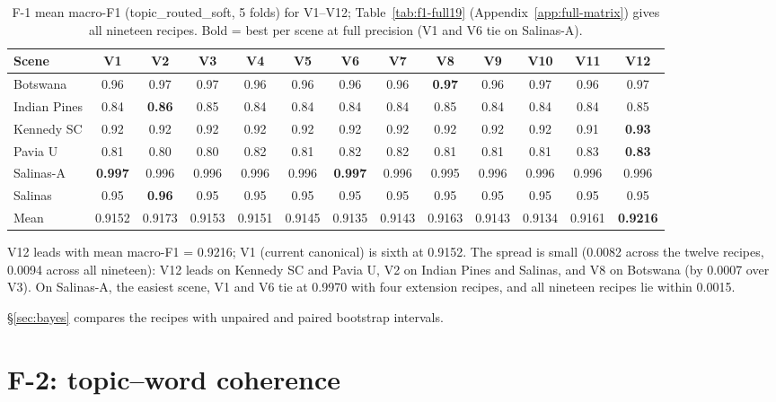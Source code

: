 \documentclass[journal,a4paper,10pt]{IEEEtran}
\begin{document}
\begin{table}[ht]
\caption{F-1 mean macro-F1 (topic\_routed\_soft, 5 folds) for V1--V12;
Table~\ref{tab:f1-full19} (Appendix~\ref{app:full-matrix}) gives all
nineteen recipes. Bold = best per scene at full precision (V1 and V6
tie on Salinas-A).}
\label{tab:f1-full}
\centering
\small
\begin{tabular}{lcccccccccccc}
\toprule
Scene & V1 & V2 & V3 & V4 & V5 & V6 & V7 & V8 & V9 & V10 & V11 & V12 \\
\midrule
Botswana          & 0.96 & 0.97 & 0.97 & 0.96 & 0.96 & 0.96 & 0.96 & \textbf{0.97} & 0.96 & 0.97 & 0.96 & 0.97 \\
Indian Pines      & 0.84 & \textbf{0.86} & 0.85 & 0.84 & 0.84 & 0.84 & 0.84 & 0.85 & 0.84 & 0.84 & 0.84 & 0.85 \\
Kennedy SC        & 0.92 & 0.92 & 0.92 & 0.92 & 0.92 & 0.92 & 0.92 & 0.92 & 0.92 & 0.92 & 0.91 & \textbf{0.93} \\
Pavia U           & 0.81 & 0.80 & 0.80 & 0.82 & 0.81 & 0.82 & 0.82 & 0.81 & 0.81 & 0.81 & 0.83 & \textbf{0.83} \\
Salinas-A         & \textbf{0.997} & 0.996 & 0.996 & 0.996 & 0.996 & \textbf{0.997} & 0.996 & 0.995 & 0.996 & 0.996 & 0.996 & 0.996 \\
Salinas           & 0.95 & \textbf{0.96} & 0.95 & 0.95 & 0.95 & 0.95 & 0.95 & 0.95 & 0.95 & 0.95 & 0.95 & 0.95 \\
\midrule
Mean              & 0.9152 & 0.9173 & 0.9153 & 0.9151 & 0.9145 & 0.9135 & 0.9143 & 0.9163 & 0.9143 & 0.9134 & 0.9161 & \textbf{0.9216} \\
\bottomrule
\end{tabular}
\end{table}

V12 leads with mean macro-F1 = 0.9216; V1 (current canonical) is sixth
at 0.9152. The spread is small (0.0082 across the twelve recipes,
0.0094 across all nineteen): V12 leads on Kennedy SC and Pavia U, V2 on
Indian Pines and Salinas, and V8 on Botswana (by 0.0007 over V3). On
Salinas-A, the easiest scene, V1 and V6 tie at 0.9970 with four
extension recipes, and all nineteen recipes lie within 0.0015.

\S\ref{sec:bayes} compares the recipes with unpaired and paired
bootstrap intervals.

\section{F-2: topic--word coherence}\label{sec:f2-results}
\end{document}
